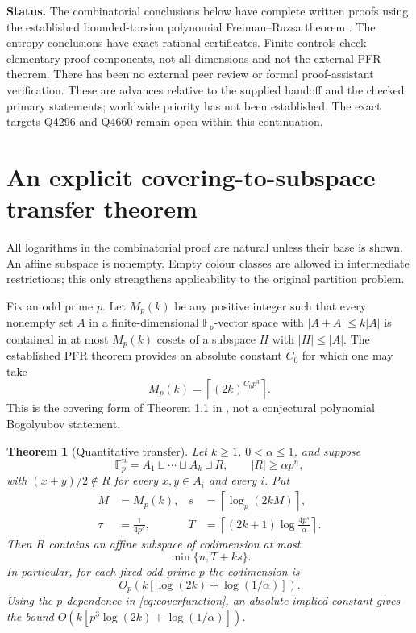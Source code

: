 \documentclass[11pt]{article}
\newtheorem{theorem}{Theorem}[section]
\theoremstyle{remark}
\newcommand{\Fp}{\mathbb F_p}
\begin{document}
\textbf{Status.} The combinatorial conclusions below have complete written
proofs using the established bounded-torsion polynomial Freiman--Ruzsa
theorem \cite{pfr}. The entropy conclusions have exact rational certificates.
Finite controls check elementary proof components, not all dimensions and
not the external PFR theorem. There has been no external peer review or
formal proof-assistant verification. These are advances relative to the
supplied handoff and the checked primary statements; worldwide priority
has not been established. The exact targets Q4296 and Q4660 remain open
within this continuation.

\section{An explicit covering-to-subspace transfer theorem}

All logarithms in the combinatorial proof are natural unless their base is
shown. An affine subspace is nonempty. Empty colour classes are allowed in
intermediate restrictions; this only strengthens applicability to the
original partition problem.

Fix an odd prime $p$. Let $M_p(k)$ be any positive integer such that every
nonempty set $A$ in a finite-dimensional $\Fp$-vector space with
$|A+A|\leq k|A|$ is contained in at most $M_p(k)$ cosets of a subspace $H$
with $|H|\leq |A|$. The established PFR theorem provides an absolute constant
$C_0$ for which one may take
\begin{equation}\label{eq:coverfunction}
 M_p(k)=\left\lceil(2k)^{C_0p^3}\right\rceil.
\end{equation}
This is the covering form of Theorem 1.1 in \cite{pfr}, not a conjectural
polynomial Bogolyubov statement.

\begin{theorem}[Quantitative transfer]\label{thm:transfer}
Let $k\geq1$, $0<\alpha\leq1$, and suppose
\[
 \Fp^n=A_1\sqcup\cdots\sqcup A_k\sqcup R,\qquad
 |R|\geq\alpha p^n,
\]
with $(x+y)/2\notin R$ for every $x,y\in A_i$ and every $i$.
Put
\begin{align}
 M&=M_p(k), &
 s&=\left\lceil\log_p(2kM)\right\rceil,\label{eq:s}\\
 \tau&=\frac{1}{4p^s}, &
 T&=\left\lceil(2k+1)\log\frac{4p^s}{\alpha}\right\rceil.
 \label{eq:tauT}
\end{align}
Then $R$ contains an affine subspace of codimension at most
\[
 \min\{n,T+ks\}.
\]
In particular, for each fixed odd prime $p$ the codimension is
\begin{equation}\label{eq:mainasymptotic}
 O_p\!\left(k\left[\log(2k)+\log(1/\alpha)\right]\right).
\end{equation}
Using the $p$-dependence in \eqref{eq:coverfunction}, an absolute implied
constant gives the bound
$O(k[p^3\log(2k)+\log(1/\alpha)])$.
\end{theorem}
\end{document}
